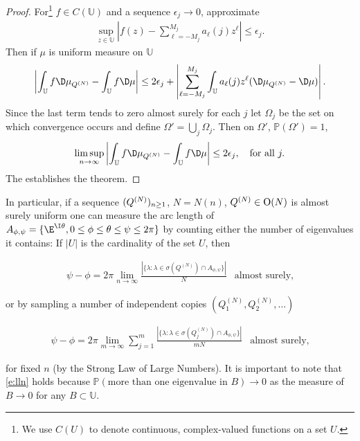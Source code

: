 \begin{proof}
For\footnote{We use $C(U)$ to denote continuous, complex-valued functions on a set $U$.} $f \in C(\mathbb U)$ and a sequence $\epsilon_j \to 0$, approximate
\begin{align}
\sup_{z \in \mathbb U} \left| f(z) - \sum_{\ell = -M_j}^{M_j} a_\ell(j) z^\ell \right| \leq \epsilon_j.
\end{align}
Then if $\mu$ is uniform measure on $\mathbb U$
\begin{align}
\left| \int_{\mathbb U} f \D\mu_{Q^{(N)}} - \int_{\mathbb U} f \D\mu \right| \leq 2 \epsilon_j + \left| \sum_{\ell = -M_j}^{M_j}  \int_{\mathbb U} a_\ell(j) z^\ell (\D\mu_{Q^{(N)}} - \D\mu) \right|.
\end{align}
Since the last term tends to zero almost surely for each $j$ let $\Omega_j$ be the set on which convergence occurs and define $\Omega ' = \bigcup_j \Omega_j$.  Then on  $\Omega'$, $\mathbb P(\Omega') = 1$,
\begin{align}
\limsup_{n \to \infty} \left| \int_{\mathbb U} f \D\mu_{Q^{(N)}} - \int_{\mathbb U} f \D\mu \right| \leq 2 \epsilon_j, \quad \text{for all } j.
\end{align}
The establishes the theorem.
\end{proof}

In particular, if a sequence $(Q^{(N)})_{n \geq 1}$, $N = N(n)$, $Q^{(N)} \in \mathrm O(N)$ is almost surely uniform one can measure the arc length of $A_{\phi,\psi} = \{ \E^{\I \theta}, 0 \leq \phi \leq \theta \leq \psi \leq 2 \pi\}$ by counting either the number of eigenvalues it contains:  If $|U|$ is the cardinality of the set $U$, then

\begin{align}\label{e:as}
\psi - \phi = 2 \pi \lim_{n \to \infty} \frac{| \{ \lambda : \lambda \in \sigma( Q^{(N)} ) \cap A_{\phi,\psi} \} |}{N}~~ \text{ almost surely,}
\end{align}

or by sampling a number of independent copies $(Q^{(N)}_1,Q^{(N)}_2, \ldots)$

\begin{align}\label{e:lln}
\psi - \phi = 2 \pi \lim_{m \to \infty}   \sum_{j=1}^m \frac{| \{ \lambda : \lambda \in \sigma( Q^{(N)}_j ) \cap A_{\phi,\psi} \} |}{mN}~~ \text{ almost surely,}
\end{align}

for fixed $n$ (by the Strong Law of Large Numbers).  It is important to note that \eqref{e:lln} holds because $\mathbb P( \text{more than one eigenvalue in } B) \to 0$ as the measure of $B \to 0$ for any $B \subset \mathbb U$.  

